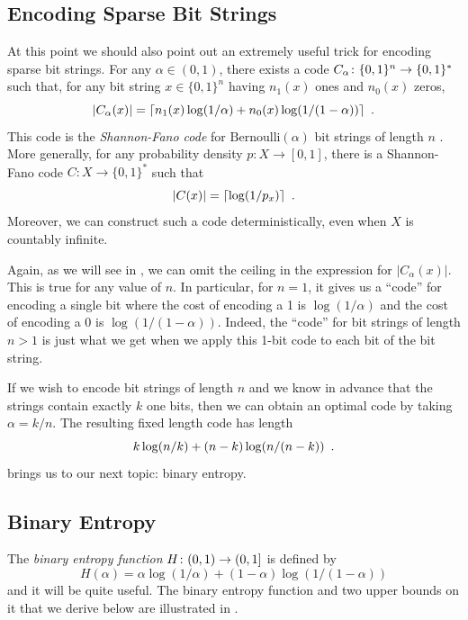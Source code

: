 \documentclass{patmorin}
\begin{document}
\subsection{Encoding Sparse Bit Strings}

At this point we should also point out an extremely useful trick 
for encoding sparse bit strings. For any $\alpha\in(0,1)$,
there exists a code $C_\alpha\colon \{0,1\}^n\rightarrow \{0,1\}^*$
such that, for any bit string $x\in\{0,1\}^n$ having $n_1(x)$ ones and
$n_0(x)$ zeros,
\begin{equation}
  |C_\alpha(x)| = \lceil n_1(x)\log(1/\alpha) + n_0(x)\log(1/(1-\alpha)) \rceil \enspace .
  \eqlabel{sparse-bitstring-i}
\end{equation}
This code is the \emph{Shannon-Fano code}
for $\mathrm{Bernoulli}(\alpha)$ bit strings of length $n$
\cite{fano:transmission,shannon:mathematical}. 
More generally, for any probability density $p : X \to [0, 1]$,
there is a Shannon-Fano code $C : X \to \{0, 1\}^*$ 
such that
\[
  |C(x)| = {\lceil \log (1/p_x) \rceil} \enspace .
\]
Moreover, we can construct such a code deterministically, even when
$X$ is countably infinite.

Again, as we will see in , we can omit the ceiling in the
expression for $|C_\alpha(x)|$.  This is true for any value of $n$. In
particular, for $n=1$, it gives us a ``code'' for encoding a single
bit where the cost of encoding a 1 is $\log(1/\alpha)$ and the cost of
encoding a 0 is $\log(1/(1-\alpha))$.  Indeed, the ``code'' for bit
strings of length $n>1$ is just what we get when we apply this 1-bit
code to each bit of the bit string.

If we wish to encode bit strings of length $n$ and we know in advance
that the strings contain exactly $k$ one bits, then we can obtain
an optimal code 
by taking $\alpha=k/n$. The resulting fixed length
code has length
\begin{equation}
  k\log (n/k) + (n-k)\log(n/(n-k))  \eqlabel{sparse-bitstring-ii} \enspace .
\end{equation}
 brings us to our next topic: binary entropy.

\subsection{Binary Entropy}

The \emph{binary entropy function} $H\colon (0,1)\to(0,1]$ is defined
by
\[
  H(\alpha) = \alpha\log(1/\alpha) + (1-\alpha)\log(1/(1-\alpha)) 
\]
and it will be quite useful.  The binary entropy function and two upper
bounds on it that we derive below are illustrated in .
\end{document}
